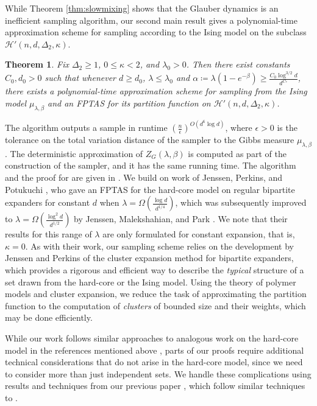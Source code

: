 \documentclass[reqno,a4paper,11pt]{amsart}
\newtheorem{theorem}{Theorem}[section]
\newcommand{\cH}{\mathcal{H}}
\newcommand{\lam}{\lambda}
\newcommand{\ex}{\kappa}
\newcommand{\exx}{C_*}
\newcommand{\codeg}{\Delta_2}
\begin{document}
While Theorem \ref{thm:slowmixing} shows that the Glauber dynamics is an inefficient sampling algorithm, our second main result gives a polynomial-time approximation scheme for sampling according to the Ising model on the subclass $\cH'(n,d,\codeg, \ex)$.
\begin{theorem} \label{thm:efficient_sampling}
    Fix $\codeg \ge 1$, $0 \le \ex < 2$, and $\lam_0>0$. Then there exist constants $C_0, d_0 > 0$ such that whenever $d \ge d_0$, $\lambda \le \lam_0$ and $\alpha \coloneqq \lam(1 - e^{-\beta}) \ge \frac{C_0 \log^{3/2} d}{d^{\exx}}$, there exists a polynomial-time approximation scheme for sampling from the Ising model $\mu_{\lam,\beta}$ and an FPTAS for its partition function on $\cH'(n,d,\codeg,\ex)$.
\end{theorem}
The algorithm outputs a sample in runtime $\left(\frac{n}{\epsilon} \right)^{O(d^6 \log d)}$, where $\epsilon > 0$ is the tolerance on the total variation distance of the sampler to the Gibbs measure $\mu_{\lam,\beta}$. The deterministic approximation of $Z_G(\lam,\beta)$ is computed as part of the construction of the sampler, and it has the same running time.
The algorithm and the proof for  are given in . We build on work of Jenssen, Perkins, and Potukuchi \cite{JePePo23}, who gave an FPTAS for the hard-core model on regular bipartite expanders for constant $d$ when $\lambda = \Omega\left(\frac{\log d}{d^{1/4}}\right)$, which was subsequently improved to $\lambda = \Omega\left(\frac{\log^2 d}{d^{1/2}}\right)$ by Jenssen, Malekshahian, and Park \cite{jenssen2024refined}. We note that their results for this range of $\lam$ are only formulated for constant expansion, that is, $\ex=0$.
As with their work, our sampling scheme relies on the development by Jenssen and Perkins \cite{jenssen2020independent} of the cluster expansion method for bipartite expanders, which provides a rigorous and efficient way to describe the \emph{typical} structure of a set drawn from the hard-core or the Ising model. Using the theory of polymer models and cluster expansion, we reduce the task of approximating the partition function to the computation of \emph{clusters} of bounded size and their weights, which may be done efficiently. 

While our work follows similar approaches to analogous work on the hard-core model in the references mentioned above \cite{GaTe2006, jenssen2024refined, JePePo23}, parts of our proofs require additional technical considerations that do not arise in the hard-core model, since we need to consider more than just independent sets. We handle these complications using results and techniques from our previous paper \cite{GeKaSaWdo25}, which follow similar techniques to \cite{kronenberg2022independent,peled2020long}.
\end{document}
